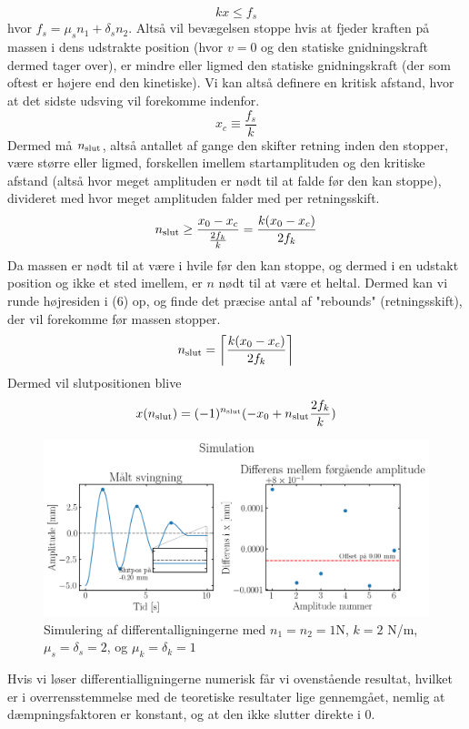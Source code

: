 \begin{equation*}
    kx \leq f_s
\end{equation*}
hvor $f_s = \mu_s n_1 + \delta_s n_2$. Altså vil bevægelsen stoppe hvis at fjeder kraften på massen i dens udstrakte position (hvor $v = 0$ og den statiske gnidningskraft dermed tager over), 
er mindre eller ligmed den statiske gnidningskraft (der som oftest er højere end den kinetiske). Vi kan altså definere en kritisk afstand, hvor at det sidste udsving vil forekomme indenfor.
\begin{equation}
    x_c \equiv \frac{f_s}{k}
\end{equation}
Dermed må $n_{\textup{slut}}$, altså antallet af gange den skifter retning inden den stopper, 
være større eller ligmed, forskellen imellem startamplituden og den kritiske afstand (altså hvor meget amplituden er nødt til at falde før den kan stoppe), divideret med hvor meget amplituden falder med per retningsskift.
\begin{equation}
    n_{\textup{slut}} \geq \frac{x_0 - x_c}{\frac{2f_k}{k}} = \frac{k(x_0 - x_c)}{2f_k}
\end{equation}
Da massen er nødt til at være i hvile før den kan stoppe, og dermed i en udstakt position og ikke et sted imellem, er $n$ nødt til at være et heltal. 
Dermed kan vi runde højresiden i (6) op, og finde det præcise antal af "rebounds" (retningsskift), der vil forekomme før massen stopper.
\begin{equation}
    n_{\textup{slut}} = \left \lceil \frac{k(x_0 - x_c)}{2f_k} \right \rceil
\end{equation}
Dermed vil slutpositionen blive
\begin{equation}
    x(n_{\textup{slut}}) = (-1)^{n_{\textup{slut}}} (-x_0 + n_{\textup{slut}} \frac{2f_k}{k})
\end{equation}
\begin{figure}[h]
    \centering
    \includegraphics[width=0.8\linewidth,origin=c]{figures/Simulation.png}
    \caption{Simulering af differentalligningerne med $n_1=n_2=1$N, $k = 2$ N/m, $\mu_s = \delta_s = 2$, og $\mu_k = \delta_k = 1$}
    \label{fig:simulering}
\end{figure}
Hvis vi løser differentialligningerne numerisk får vi ovenstående resultat, hvilket er i overrensstemmelse med de teoretiske resultater lige gennemgået, 
nemlig at dæmpningsfaktoren er konstant, og at den ikke slutter direkte i 0.